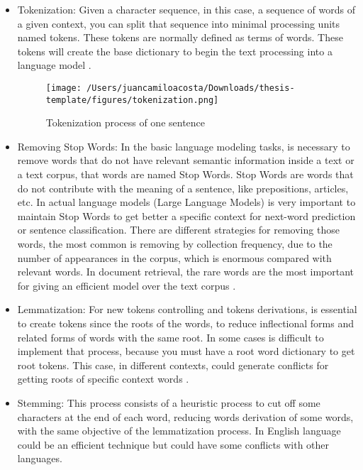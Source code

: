 \begin{itemize}
    \item Tokenization: Given a character sequence, in this case, a sequence of words of a given context, you can split that sequence into minimal processing units named tokens. These tokens are normally defined as terms of words. These tokens will create the base dictionary to begin the text processing into a language model \citet{information-retrieval}. 

    \begin{figure}[H]
    \centering
    \texttt{[image: /Users/juancamiloacosta/Downloads/thesis-template/figures/tokenization.png]}
    \caption{Tokenization process of one sentence \citet{information-retrieval} }
    \label{fig:tokenization}
    \end{figure}
    
    \item Removing Stop Words: In the basic language modeling tasks, is necessary to remove words that do not have relevant semantic information inside a text or a text corpus, that words are named Stop Words. Stop Words are words that do not contribute with the meaning of a sentence, like prepositions, articles, etc. In actual language models (Large Language Models) is very important to maintain Stop Words to get better a specific context for next-word prediction or sentence classification. There are different strategies for removing those words, the most common is removing by collection frequency, due to the number of appearances in the corpus, which is enormous compared with relevant words. In document retrieval, the rare words are the most important for giving an efficient model over the text corpus \citet{information-retrieval}. 
    \item Lemmatization: For new tokens controlling and tokens derivations, is essential to create tokens since the roots of the words, to reduce inflectional forms and related forms of words with the same root. In some cases is difficult to implement that process, because you must have a root word dictionary to get root tokens. This case, in different contexts, could generate conflicts for getting roots of specific context words \cite{information-retrieval}.
    \item Stemming: This process consists of a heuristic process to cut off some characters at the end of each word, reducing words derivation of some words, with the same objective of the lemmatization process. In English language could be an efficient technique but could have some conflicts with other languages.
\end{itemize}


